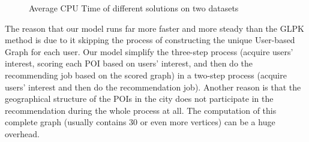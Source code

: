 \documentclass[runningheads]{llncs}
\begin{document}
\begin{figure}[htbp]
	\centering
	\quad
	\caption{Average CPU Time of different solutions on two datasets}
	\label{fig:3}%
\end{figure}

The reason that our model runs far more faster and more steady than the GLPK method is due to it skipping the process of constructing the unique User-based Graph for each user. Our model simplify the three-step process (acquire users' interest, scoring each POI based on users' interest, and then do the recommending job based on the scored graph) in a two-step process (acquire users' interest and then do the recommendation job). Another reason is that the geographical structure of the POIs in the city does not participate in the recommendation during the whole process at all. The computation of this complete graph (usually contains 30 or even more vertices) can be a huge overhead.
\end{document}
